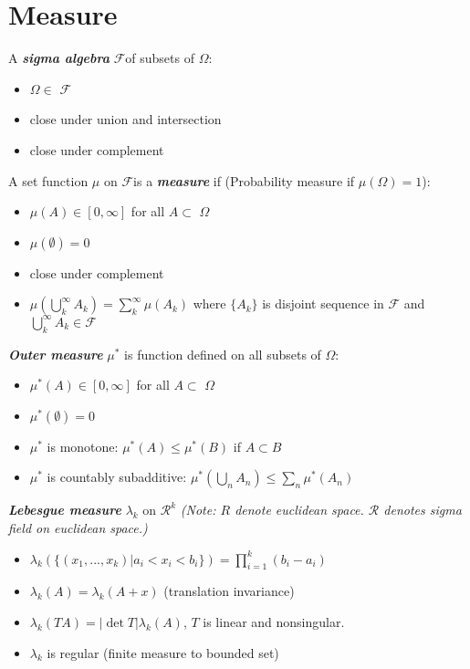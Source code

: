\documentclass[10pt,twocolumn]{article}
\newenvironment{mydef}[1][Definition]{\begin{trivlist}
\item[\hskip \labelsep {\bfseries #1}]}{\end{trivlist}}
\newcommand{\sigmaField} {$\mathscr{F}$}
\newcommand{\samspace} {$\Omega$}
\newcommand{\real}{ \mathscr{R}}
\newcommand{\bt}[1]{\textbf{\textit{#1}}}
\begin{document}
\section*{Measure}
\begin{mydef}
	A \bt{sigma algebra} \sigmaField of subsets of \samspace:
	\begin{itemize}
		\item \samspace $\in$ \sigmaField
		\item close under union and intersection
		\item close under complement
	\end{itemize}
\end{mydef}

\begin{mydef}
	A set function $\mu$ on \sigmaField is a \bt{measure} if (Probability measure if $\mu (\Omega ) = 1$):
	\begin{itemize}
		\item $\mu (A)\in [0, \infty]$ for all $A \subset$ \samspace
		\item $\mu (\emptyset) = 0$
		\item close under complement
		\item $\mu (\bigcup^{\infty}_k A_k) = \sum^{\infty}_k \mu (A_k)$ where $\{A_k\}$ is disjoint sequence in $\mathscr{F}$ and $\bigcup^{\infty}_kA_k \in \mathscr{F}$
	\end{itemize}
\end{mydef}

\begin{mydef}
	\bt{Outer measure} $\mu^*$ is function defined on all subsets of \samspace:
	\begin{itemize}
		\item $\mu^*(A)\in [0, \infty]$ for all $A \subset$ \samspace
		\item $\mu^*(\emptyset) = 0$
		\item $\mu^*$ is monotone: $\mu^*(A) \leq \mu^*(B)$ if $A \subset B$
		\item $\mu^*$ is countably subadditive: $\mu^*(\bigcup_nA_n) \leq \sum_n \mu^*(A_n)$
	\end{itemize}
\end{mydef}

\begin{mydef}
	\bt{Lebesgue measure} $\lambda_k$ on $\real ^k$  \textit{(Note: $R$ denote euclidean space. $\mathscr{R}$ denotes sigma field on euclidean space.)} 
	\begin{itemize}
		\item $\lambda_k(\{(x_1, ..., x_k)| a_i < x_i < b_i\}) = \prod^k_{i=1}(b_i - a_i)$
		\item $\lambda_k(A) = \lambda_k(A+x)$ (translation invariance)
		\item $\lambda_k(TA) = |\det{T}|\lambda_k(A)$, $T$ is linear and nonsingular.
		\item $\lambda_k$ is regular (finite measure to bounded set)
	\end{itemize}
\end{mydef}
\end{document}
